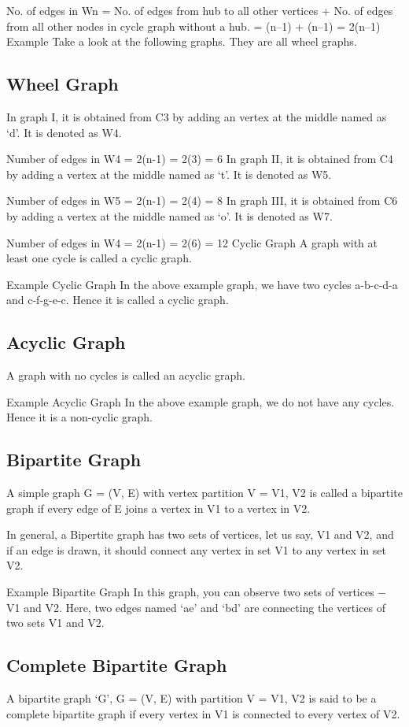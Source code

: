 No. of edges in Wn = No. of edges from hub to all other vertices +
                     No. of edges from all other nodes in cycle graph without a hub.
                     = (n–1) + (n–1)
                     = 2(n–1)
Example
Take a look at the following graphs. They are all wheel graphs.

\subsection{Wheel Graph}
In graph I, it is obtained from C3 by adding an vertex at the middle named as ‘d’. It is denoted as W4.

Number of edges in W4 = 2(n-1) = 2(3) = 6
In graph II, it is obtained from C4 by adding a vertex at the middle named as ‘t’. It is denoted as W5.

Number of edges in W5 = 2(n-1) = 2(4) = 8
In graph III, it is obtained from C6 by adding a vertex at the middle named as ‘o’. It is denoted as W7.

Number of edges in W4 = 2(n-1) = 2(6) = 12
Cyclic Graph
A graph with at least one cycle is called a cyclic graph.

Example
Cyclic Graph
In the above example graph, we have two cycles a-b-c-d-a and c-f-g-e-c. Hence it is called a cyclic graph.

\subsection{Acyclic Graph}
A graph with no cycles is called an acyclic graph.

Example
Acyclic Graph
In the above example graph, we do not have any cycles. Hence it is a non-cyclic graph.

\subsection{Bipartite Graph}
A simple graph G = (V, E) with vertex partition V = {V1, V2} is called a bipartite graph if every edge of E joins a vertex in V1 to a vertex in V2.

In general, a Bipertite graph has two sets of vertices, let us say, V1 and V2, and if an edge is drawn, it should connect any vertex in set V1 to any vertex in set V2.

Example
Bipartite Graph
In this graph, you can observe two sets of vertices − V1 and V2. Here, two edges named ‘ae’ and ‘bd’ are connecting the vertices of two sets V1 and V2.

\subsection{Complete Bipartite Graph}
A bipartite graph ‘G’, G = (V, E) with partition V = {V1, V2} is said to be a complete bipartite graph if every vertex in V1 is connected to every vertex of V2.

